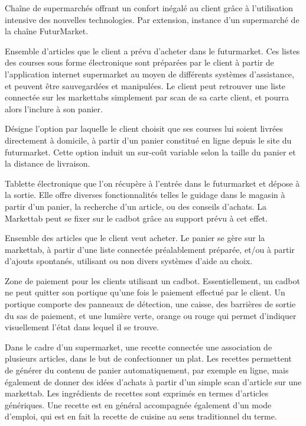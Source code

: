 Chaîne de supermarchés offrant un confort inégalé au client grâce à l'utilisation intensive des nouvelles technologies.
Par extension, instance d'un supermarché de la chaîne FuturMarket.

Ensemble d'articles que le client a prévu d'acheter dans le futurmarket.
Ces listes des courses sous forme électronique sont préparées par le client à partir de l'application internet supermarket au moyen de différents systèmes d'assistance, et peuvent être sauvegardées et manipulées. 
Le client peut retrouver une liste connectée sur les markettabs simplement par scan de sa carte client, et pourra alors l'inclure à son panier.

Désigne l'option par laquelle le client choisit que ses courses lui soient livrées directement à domicile, à partir d'un panier constitué en ligne depuis le site du futurmarket.
Cette option induit un sur-coût variable selon la taille du panier et la distance de livraison.

Tablette électronique que l'on récupère à l'entrée dans le futurmarket et dépose à la sortie.
Elle offre diverses fonctionnalités telles le guidage dans le magasin à partir d'un panier, la recherche d'un article, ou des conseils d'achats.
La Markettab peut se fixer sur le cadbot grâce au support prévu à cet effet.

Ensemble des articles que le client veut acheter.
Le panier se gère sur la markettab, à partir d'une liste connectée préalablement préparée, et/ou à partir d'ajouts spontanés, utilisant ou non divers systèmes d'aide au choix.

Zone de paiement pour les clients utilisant un cadbot.
Essentiellement, un cadbot ne peut quitter son portique qu'une fois le paiement effectué par le client. 
Un portique comporte des panneaux de détection, une caisse, des barrières de sortie du sas de paiement, et une lumière verte, orange ou rouge qui permet d'indiquer visuellement l'état dans lequel il se trouve.

Dans le cadre d'un supermarket, une recette connectée une association de plusieurs articles, dans le but de confectionner un plat. 
Les recettes permettent de générer du contenu de panier automatiquement, par exemple en ligne, mais également de donner des idées d'achats à partir d'un simple scan d'article sur une markettab.
Les ingrédients de recettes sont exprimés en termes d'articles génériques.
Une recette est en général accompagnée également d'un mode d'emploi, qui est en fait la recette de cuisine au sens traditionnel du terme.

